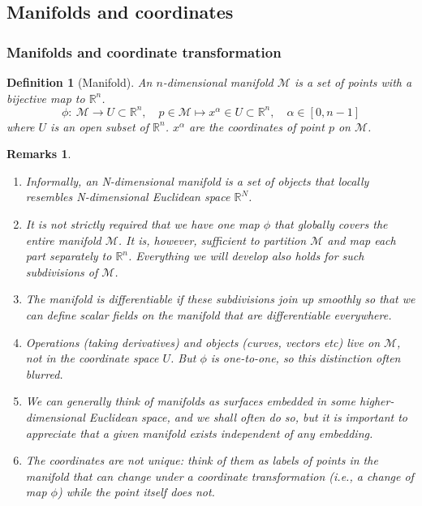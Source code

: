 \documentclass[a4paper]{article}
\newtheorem{remarks}{Remarks}[section]
\theoremstyle{new}
\newtheorem{defi}{Definition}[section]
\begin{document}
\subsection{Manifolds and coordinates}
\subsubsection{Manifolds and coordinate transformation}
\begin{defi}[Manifold]
An $n$-dimensional manifold $\mathcal{M}$ is a set of points with a bijective map to $\mathbb{R}^n$.
$$\phi:~\mathcal{M}\rightarrow U\subset\mathbb{R}^n,\quad p\in\mathcal{M}\mapsto x^\alpha\in U\subset\mathbb{R}^n,\quad\alpha\in[0,n-1]$$
where $U$ is an open subset of $\mathbb{R}^n$. $x^\alpha$ are the coordinates of point $p$ on $\mathcal{M}$.
\end{defi}
\begin{remarks}\leavevmode
\begin{enumerate}
\item Informally, an N-dimensional manifold is a set of objects that locally resembles N-dimensional Euclidean space $\mathbb{R}^N$.
\item It is not strictly required that we have one map $\phi$ that globally covers the entire manifold $\mathcal{M}$. It is, however, sufficient to partition $\mathcal{M}$ and map each part separately to $\mathbb{R}^n$. Everything we will develop also holds for such subdivisions of $\mathcal{M}$. 
\item The manifold is differentiable if these subdivisions join up smoothly so that we can define scalar fields on the manifold that are differentiable everywhere.
\item Operations (taking derivatives) and objects (curves, vectors etc) live on $\mathcal{M}$, not in the coordinate space $U$. But $\phi$ is one-to-one, so this distinction often blurred.
\item We can generally think of manifolds as surfaces embedded in some higher-dimensional Euclidean space, and we shall often do so, but it is important to appreciate that a given manifold exists independent of any embedding.
\item The coordinates are not unique: think of them as labels of points in the manifold that can change under a coordinate transformation (i.e., a change of map $\phi$) while the point itself does not.
\end{enumerate}
\end{remarks}
\end{document}
